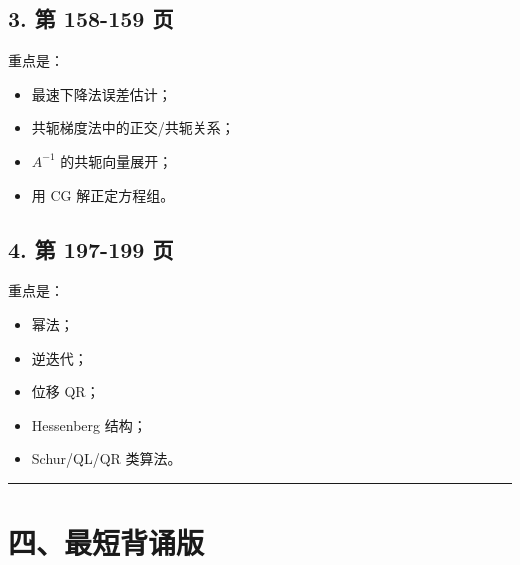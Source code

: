 \documentclass[11pt,a4paper]{ctexart}
\begin{document}

\subsection*{3. 第 158-159 页}


重点是：

\begin{itemize}

\item 最速下降法误差估计；

\item 共轭梯度法中的正交/共轭关系；

\item $A^{-1}$ 的共轭向量展开；

\item 用 CG 解正定方程组。

\end{itemize}


\subsection*{4. 第 197-199 页}


重点是：

\begin{itemize}

\item 幂法；

\item 逆迭代；

\item 位移 QR；

\item Hessenberg 结构；

\item Schur/QL/QR 类算法。

\end{itemize}

\bigskip\hrule\bigskip


\section*{四、最短背诵版}

\end{document}
